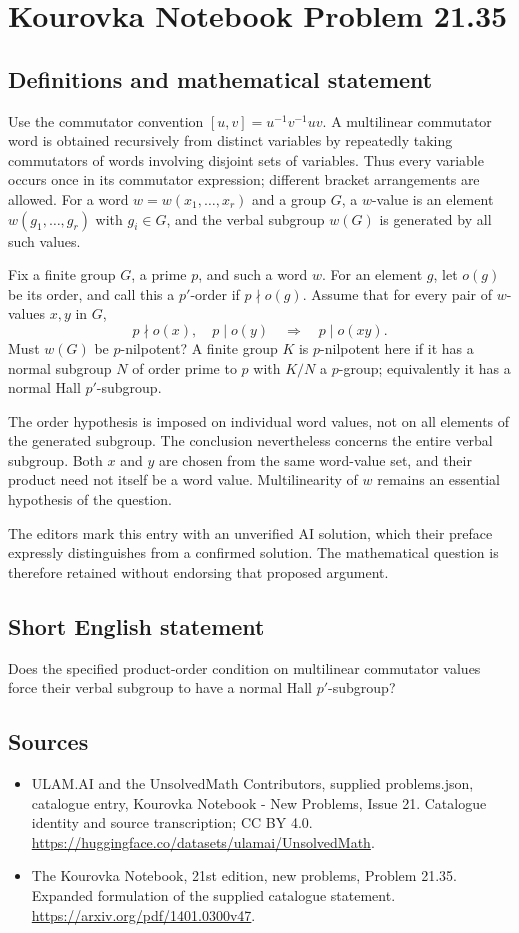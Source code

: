 \documentclass[11pt,a4paper]{article}
\begin{document}
\section*{Kourovka Notebook Problem 21.35}\label{statement}

\subsection{Definitions and mathematical statement}
Use the commutator convention $[u,v]=u^{-1}v^{-1}uv$.
A multilinear commutator word is obtained recursively from distinct
variables by repeatedly taking commutators of words involving disjoint
sets of variables. Thus every variable occurs once in its commutator
expression; different bracket arrangements are allowed.
For a word $w=w(x_1,\ldots,x_r)$ and a group $G$, a $w$-value is an
element $w(g_1,\ldots,g_r)$ with $g_i\in G$, and the verbal subgroup
$w(G)$ is generated by all such values.

Fix a finite group $G$, a prime $p$, and such a word $w$. For an element
$g$, let $o(g)$ be its order, and call this a $p'$-order if $p\nmid o(g)$.
Assume that for every pair of $w$-values $x,y$ in $G$,
\[
 p\nmid o(x),\quad p\mid o(y)\quad\Longrightarrow\quad p\mid o(xy).
\]
Must $w(G)$ be $p$-nilpotent? A finite group $K$ is $p$-nilpotent here
if it has a normal subgroup $N$ of order prime to $p$ with $K/N$ a
$p$-group; equivalently it has a normal Hall $p'$-subgroup.

The order hypothesis is imposed on individual word values, not on all
elements of the generated subgroup. The conclusion nevertheless concerns
the entire verbal subgroup. Both $x$ and $y$ are chosen from the same
word-value set, and their product need not itself be a word value.
Multilinearity of $w$ remains an essential hypothesis of the question.

The editors mark this entry with an unverified AI solution, which their
preface expressly distinguishes from a confirmed solution. The mathematical
question is therefore retained without endorsing that proposed argument.
\subsection{Short English statement}
Does the specified product-order condition on multilinear commutator values force their verbal subgroup to have a normal Hall $p'$-subgroup?
\subsection{Sources}
\begin{itemize}
\item[S1] ULAM.AI and the UnsolvedMath Contributors, supplied problems.json, catalogue entry, Kourovka Notebook - New Problems, Issue 21. Catalogue identity and source transcription; CC BY 4.0.
\url{https://huggingface.co/datasets/ulamai/UnsolvedMath}.
\item[S2] The Kourovka Notebook, 21st edition, new problems, Problem 21.35. Expanded formulation of the supplied catalogue statement.
\url{https://arxiv.org/pdf/1401.0300v47}.
\end{itemize}
\end{document}
